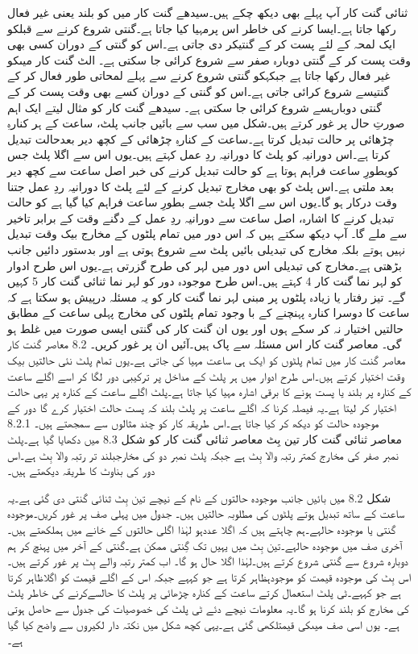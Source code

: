 	ثنائی گنت کار آپ پہلے بھی دیکھ چکے ہیں۔سیدھے گنت کار میں  کو بلند یعنی غیر فعال رکھا جاتا ہے۔ایسا کرنے کی خاطر اس پرمہیا کیا جاتا ہے۔گنتی شروع کرنے سے قبلکو ایک لمحہ کے لئے پست کر کے گنتیکر دی جاتی ہے۔اس کو گنتی کے دوران کسی بھی وقت پست کر کے گنتی دوبارہ صفر سے شروع کرائی جا سکتی ہے۔
	الٹ گنت کار میںکو غیر فعال رکھا جاتا ہے جبکہکو گنتی شروع کرنے سے پہلے لمحاتی طور فعال کر کے گنتیسے شروع کرائی جاتی ہے۔اس کو گنتی کے دوران کسے بھی وقت پست کر کے گنتی دوبارہسے شروع کرائی جا سکتی ہے۔
	سیدھے گنت کار کو مثال لیتے ایک اہم صورتِ حال پر غور کرتے ہیں۔شکل میں سب سے بائیں جانب پلٹ، ساعت کے ہر کنارہِ چڑھائی پر حالت تبدیل کرتا ہے۔ساعت کے کنارہِ چڑھائی کے کچھ دیر بعدحالت تبدیل کرتا ہے۔اس دورانیہ کو پلٹ کا دورانیہ ردِ عمل کہتے ہیں۔یوں اس سے اگلا پلٹ جس کوبطورِ ساعت فراہم ہوتا ہے کو حالت تبدیل کرنے کی خبر اصل ساعت سے کچھ دیر بعد ملتی ہے۔اس پلٹ کو بھی مخارج تبدیل کرنے کے لئے پلٹ کا دورانیہ ردِ عمل جتنا وقت درکار ہو گا۔یوں اس سے اگلا پلٹ جسے بطورِ ساعت فراہم کیا گیا ہے کو حالت تبدیل کرنے کا اشارہ، اصل ساعت سے دورانیہ ردِ عمل کے دگنے وقت کے برابر تاخیر سے ملے گا۔
	آپ دیکھ سکتے ہیں کہ اس دور میں تمام پلٹوں کے مخارج بیک وقت تبدیل نہیں ہوتے بلکہ مخارج کی تبدیلی بائیں پلٹ سے شروع ہوتی ہے اور بدستور دائیں جانب بڑھتی ہے۔مخارج کی تبدیلی اس دور میں لہر کی طرح گزرتی ہے۔یوں اس طرح ادوار کو لہر نما گنت کار 4 کہتے ہیں۔اس طرح موجودہ دور کو لہر نما ثنائی گنت کار 5 کہیں گے۔
	تیز رفتار یا زیادہ پلٹوں پر مبنی لہر نما گنت کار کو یہ مسئلہ درپیش ہو سکتا ہے کہ ساعت کا دوسرا کنارہ پہنچنے کے با وجود تمام پلٹوں کی مخارج پہلی ساعت کے مطابق حالتیں اختیار نہ کر سکے ہوں اور یوں ان گنت کار کی گنتی ایسی صورت میں غلط ہو گی۔
	 معاصر گنت کار اس مسئلہ سے پاک ہیں۔آئیں ان پر غور کریں۔
8.2 معاصر گنت کار
	معاصر گنت کار میں تمام پلٹوں کو ایک ہی ساعت مہیا کی جاتی ہے۔یوں تمام پلٹ نئی حالتیں بیک وقت اختیار کرتے ہیں۔اس طرح ادوار میں ہر پلٹ کے مداخل پر ترکیبی دور لگا کر اسے اگلے ساعت کے کنارہ پر بلند یا پست ہونے کا برقی اشارہ مہیا کیا جاتا ہے۔پلٹ اگلے ساعت کے کنارہ پر یہی حالت اختیار کر لیتا ہے۔یہ فیصلہ کرنا کہ اگلے ساعت پر پلٹ بلند کہ پست حالت اختیار کرے گا دور کے موجودہ حالت کو دیکھ کر کیا جاتا ہے۔اس طریقہ کار کو چند مثالوں سے سمجھتے ہیں۔
8.2.1 معاصر ثنائی گنت کار
	تین بِٹ معاصر ثنائی گنت کار کو شکل 8.3 میں دکھایا گیا ہے۔پلٹ نمبر صفر کی مخارج کمتر  رتبہ والا بِٹ  ہے جبکہ پلٹ نمبر دو کی مخارجبلند تر رتبہ والا بِٹ ہے۔اس دور کی بناوٹ کا طریقہ دیکھتے ہیں۔



	شکل 8.2 میں بائیں جانب موجودہ حالتوں کے نام کے نیچے تین بِٹ ثنائی گنتی دی گئی ہے۔یہ ساعت کے ساتھ تبدیل ہوتے پلٹوں کی مطلوبہ حالتیں ہیں۔  جدول میں پہلی صف پر غور کریں۔موجودہ گنتی یا موجودہ حالہے۔ہم چاہتے ہیں کہ اگلا عددہو لہٰذا اگلی حالتوں کے خانے میں ہملکھتے ہیں۔آخری صف میں موجودہ حالہے۔تین بِٹ میں یہیں تک گِنتی ممکن ہے۔گنتی کے آخر میں پہنچ کر ہم دوبارہ شروع سے گنتی شروع کرتے ہیں۔لہٰذا اگلا حال ہو گا۔
	اب کمتر رتبہ والے بِٹ پر غور کرتے ہیں۔اس بِٹ کی موجودہ قیمت کو موجودہظاہر کرتا ہے جو کہہے جبکہ اس کے اگلے قیمت کو اگلاظاہر کرتا ہے جو کہہے۔ٹی پلٹ استعمال کرتے ساعت کے کنارہ چڑھائی پر پلٹ کا حالسےکرنے کی خاطر پلٹ کی مخارج کو بلند کرنا ہو گا۔یہ معلومات نیچے دئے ٹی پلٹ کی خصوصیات کی جدول سے حاصل ہوتی ہے۔ یوں اسی صف میںکی قیمتلکھی گئی ہے۔یہی کچھ شکل میں نکتہ دار لکیروں سے واضح کیا گیا ہے۔


